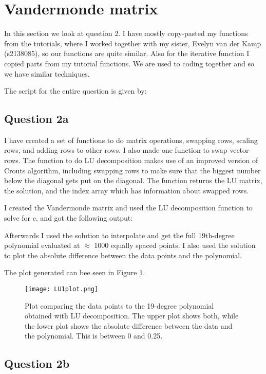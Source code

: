 \section{Vandermonde matrix}

In this section we look at question 2. 
I have mostly copy-pasted my functions from the tutorials, where I worked together with my sister,
Evelyn van der Kamp (s2138085), so our functions are quite similar.
Also for the iterative function I copied parts from my tutorial functions. 
We are used to coding together and so we have similar techniques.

The script for the entire question is given by:


\subsection{Question 2a}

I have created a set of functions to do matrix operations, swapping rows, scaling rows, 
and adding rows to other rows. I also made one function to swap vector rows.
The function to do LU decomposition makes use of an improved version of Crouts algorithm,
including swapping rows to make sure that the biggest number below the diagonal gets put on the diagonal.
The function returns the LU matrix, the solution, and the index array which has information about swapped rows.

I created the Vandermonde matrix and used the LU decomposition function to solve for $c$,
and got the following output:



Afterwards I used the solution to interpolate and get the full 19th-degree polynomial evaluated at
$\approx$ 1000 equally spaced points.
I also used the solution to plot the absolute difference between the data points and the polynomial.

The plot generated can bee seen in Figure \ref{fig:LU1}.

\begin{figure}[h!]
  \centering
  \texttt{[image: LU1plot.png]}
  \caption{Plot comparing the data points to the 19-degree polynomial obtained with LU
  decomposition. The upper plot shows both, while the lower plot shows the absolute difference
  between the data and the polynomial. This is between 0 and 0.25.}
  \label{fig:LU1}
\end{figure}

\subsection{Question 2b}

